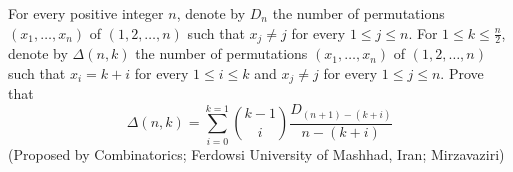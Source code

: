 For every positive integer $n$, denote by $D_n$ the number of permutations $(x_1, \dots, x_n)$ of $(1,2,\dots, n)$ such that $x_j\neq j$ for every $1\le j\le n$. For $1\le k\le \frac{n}{2}$, denote by $\Delta (n,k)$ the number of permutations $(x_1,\dots, x_n)$ of $(1,2,\dots, n)$ such that $x_i=k+i$ for every $1\le i\le k$ and $x_j\neq j$ for every $1\le j\le n$. Prove that
$$\Delta (n,k)=\sum_{i=0}^{k=1} \binom{k-1}{i} \frac{D_{(n+1)-(k+i)}}{n-(k+i)}$$
(Proposed by Combinatorics; Ferdowsi University of Mashhad, Iran; Mirzavaziri)
